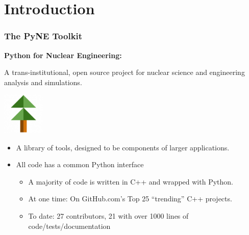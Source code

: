 \documentclass[12pt]{beamer}
\begin{document}
\section{Introduction}
\begin{frame}[fragile]
\frametitle{The PyNE Toolkit}

\centerline{\bf Python for Nuclear Engineering:}
A trans-institutional, open source project for nuclear science and engineering analysis and simulations.

\centerline{\includegraphics[width=2cm]{figures/pyne_icon_small.png}}

\begin{itemize}
\item{A library of tools, designed to be components of larger applications.}
\item{All code has a common Python interface}
\begin{itemize}
\item{A majority of code is written in C++ and wrapped with Python.}
\item{At one time: On GitHub.com's Top 25 ``trending'' C++ projects.}
\item{To date: 27 contributors, 21 with over 1000 lines of code/tests/documentation}
\end{itemize}
\end{itemize}


\end{frame}
\end{document}
